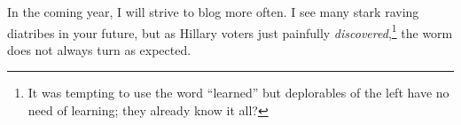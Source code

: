 In the coming year, I will strive to blog more often. I see many stark
raving diatribes in your future, but as Hillary voters just painfully
\emph{discovered},\footnote{It was tempting to use the word ``learned'' but deplorables of the
left have no need of learning; they already know it
all?
} the worm does not always turn as expected.

%
%



%